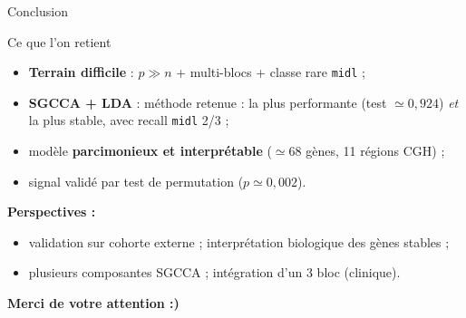 \documentclass[aspectratio=169, 10pt]{beamer}
\begin{document}
\begin{frame}{Conclusion}
  \begin{block}{Ce que l’on retient}
    \begin{itemize}
      \item \textbf{Terrain difficile} : $p \gg n$ + multi-blocs + classe rare \texttt{midl} ;
      \item \textbf{SGCCA + LDA} : méthode retenue : la plus performante (test $\simeq 0{,}924$) \textit{et} la plus stable, avec recall \texttt{midl} 2/3 ;
      \item modèle \textbf{parcimonieux et interprétable} ($\simeq 68$ gènes, 11 régions CGH) ;
      \item signal validé par test de permutation ($p \simeq 0{,}002$).
    \end{itemize}
  \end{block}

  \medskip
  \textbf{Perspectives :}
  \begin{itemize}
    \item validation sur cohorte externe ; interprétation biologique des gènes stables ;
    \item plusieurs composantes SGCCA ; intégration d’un 3\ieme{} bloc (clinique).
  \end{itemize}

  \vfill
  \begin{center}
    {\large \textbf{Merci de votre attention \quad :)}}
  \end{center}
\end{frame}
\end{document}
